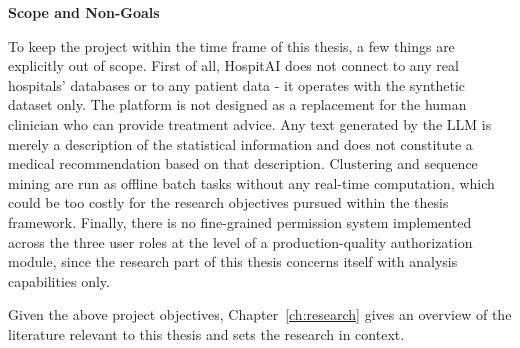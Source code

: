 \vspace{0.5em}
\noindent\textbf{Scope and Non-Goals}

To keep the project within the time frame of this thesis, a few things are explicitly out of scope. First of all, HospitAI does not connect to any real hospitals' databases or to any patient data - it operates with the synthetic dataset only. The platform is not designed as a replacement for the human clinician who can provide treatment advice. Any text generated by the LLM is merely a description of the statistical information and does not constitute a medical recommendation based on that description. Clustering and sequence mining are run as offline batch tasks without any real-time computation, which could be too costly for the research objectives pursued within the thesis framework. Finally, there is no fine-grained permission system implemented across the three user roles at the level of a production-quality authorization module, since the research part of this thesis concerns itself with analysis capabilities only.

Given the above project objectives, Chapter~\ref{ch:research} gives an overview of the literature relevant to this thesis and sets the research in context.
